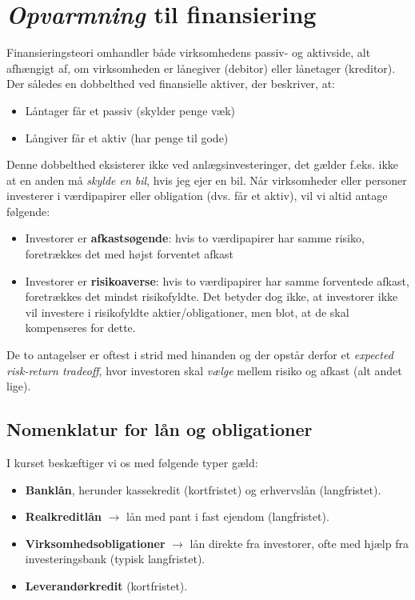 \documentclass[10pt,reqno, usenames]{article}
\begin{document}
\section{\textit{Opvarmning} til finansiering}
Finansieringsteori omhandler både virksomhedens passiv- og aktivside, alt afhængigt af, om virksomheden er lånegiver (debitor) eller lånetager (kreditor).  Der således en dobbelthed ved finansielle aktiver, der beskriver, at: 

\begin{itemize}
    \item Låntager får et passiv (skylder penge væk)
    \item Långiver får et aktiv (har penge til gode)
\end{itemize}

Denne dobbelthed eksisterer ikke ved anlægsinvesteringer, det gælder f.eks. ikke at en anden må \textit{skylde en bil}, hvis jeg ejer en bil. Når virksomheder eller personer investerer i værdipapirer eller obligation (dvs. får et aktiv), vil vi altid antage følgende: 

\begin{itemize}
    \item Investorer er \textbf{afkastsøgende}: hvis to værdipapirer har
samme risiko, foretrækkes det med højst forventet afkast
\item Investorer er \textbf{risikoaverse}: hvis to værdipapirer har samme
forventede afkast, foretrækkes det mindst risikofyldte. Det betyder dog ikke, at investorer ikke vil investere i risikofyldte aktier/obligationer, men blot, at de skal kompenseres for dette. 
\end{itemize}

De to antagelser er oftest i strid med hinanden og der opstår derfor et \textit{expected risk-return tradeoff}, hvor investoren skal \textit{vælge} mellem risiko og afkast (alt andet lige). 

\subsection{Nomenklatur for lån og obligationer}
I kurset beskæftiger vi os med følgende typer gæld: 

\begin{itemize}
    \item \textbf{Banklån}, herunder kassekredit (kortfristet) og erhvervslån (langfristet). 
    \item \textbf{Realkreditlån} $\rightarrow$ lån med pant i fast ejendom (langfristet).
    \item \textbf{Virksomhedsobligationer} $\rightarrow$ lån direkte fra investorer, ofte med hjælp fra investeringsbank (typisk langfristet).
    \item \textbf{Leverandørkredit} (kortfristet).
\end{itemize}
\end{document}
